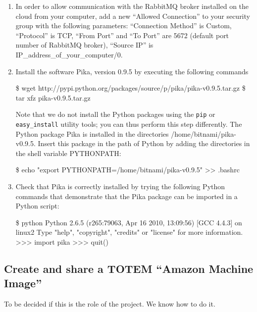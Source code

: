 \begin{enumerate}
\item In order to allow communication with the RabbitMQ broker
  installed on the cloud from your computer, add a new ``Allowed
  Connection'' to your security group with the following parameters:
  ``Connection Method'' is \textsf{Custom}, ``Protocol'' is
  \textsf{TCP}, ``From Port'' and ``To Port'' are \textsf{5672}
  (default port number of RabbitMQ broker), ``Source IP'' is
  \textsf{IP\_address\_of\_your\_computer/0}.
\item Install the software Pika, version 0.9.5 by executing the
  following commands
\begin{shellcmd}
\$ wget http://pypi.python.org/packages/source/p/pika/pika-v0.9.5.tar.gz
\$ tar xfz pika-v0.9.5.tar.gz
\end{shellcmd}
Note that we do not install the Python packages using the \texttt{pip}
or \texttt{easy\_install} utility tools; you can thus perform this
step differently. The Python package Pika is installed in the
directories \textsf{/home/bitnami/pika-v0.9.5}. Insert this
package in the path of Python by adding the directories in the shell
variable \textsf{PYTHONPATH}:
\begin{shellcmd}
\$ echo "export PYTHONPATH=/home/bitnami/pika-v0.9.5" >> .bashrc
\end{shellcmd}
\item Check that Pika is correctly installed by trying the following
  Python commands that demonstrate that the Pika package can be
  imported in a Python script:
\begin{shellcmd}
\$ python
Python 2.6.5 (r265:79063, Apr 16 2010, 13:09:56) 
[GCC 4.4.3] on linux2
Type "help", "copyright", "credits" or "license" for more information.
>>> import pika
>>> quit()
\end{shellcmd}
\end{enumerate}

\subsection{Create and share a TOTEM ``Amazon Machine Image''}
\label{SS_ec2_create_share_ami}

To be decided if this is the role of the project. We know how to do it.

\endinput
